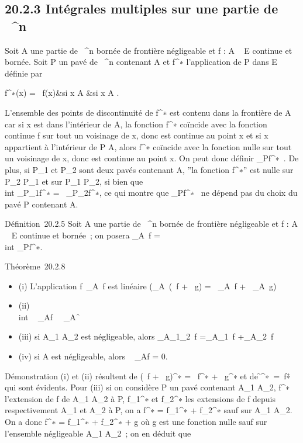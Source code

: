 \documentclass[]{article}
\begin{document}
\subsection{20.2.3 Intégrales multiples sur une partie de ~^n}

Soit A une partie de ~^n bornée de frontière négligeable et f
: A \rightarrow~ E continue et bornée. Soit P un pavé de ~^n contenant A
et f^∗ l'application de P dans E définie par

 f^∗(x) = \left \
\cases f(x)&si x \in A  &si x \in A
 \right .

L'ensemble des points de discontinuité de f^∗ est contenu
dans la frontière de A car si x est dans l'intérieur de A, la fonction
f^∗ coïncide avec la fonction continue f sur tout un
voisinage de x, donc est continue au point x et si x appartient à
l'intérieur de P \diagdown A, alors f^∗ coïncide avec la fonction
nulle sur tout un voisinage de x, donc est continue au point x. On peut
donc définir \int  _Pf^∗~. De
plus, si P_1 et P_2 sont deux pavés contenant A, ''la
fonction f^∗'' est nulle sur P_2 \diagdown P_1 et
sur P_1 \diagdown P_2, si bien que \\int
 _P_1f^∗ =\int ~
_P_2f^∗, ce qui montre que
\int  _Pf^∗~ ne dépend pas du
choix du pavé P contenant A.

Définition~20.2.5 Soit A une partie de ~^n bornée de
frontière négligeable et f : A \rightarrow~ E continue et bornée~; on posera
\int  _A~f =\\int
 _Pf^∗.

Théorème~20.2.8

\begin{itemize}
\itemsep1pt\parskip0pt
\item
  (i) L'application
  f\mapsto~\int  _A~f
  est linéaire (\int  _A~(\alpha~f + \beta~g) =
  \alpha~\int  _A~f +
  \beta~\int  _A~g)
\item
  (ii) \\int ~
  _Af\ \leq\int ~
  _A\f\
\item
  (iii) si A_1 \bigcap A_2 est négligeable, alors
  \int  _A_1\cupA_2~f
  =\int  _A_1~f
  +\int  _A_2~f
\item
  (iv) si A est négligeable, alors \int ~
  _Af = 0.
\end{itemize}

Démonstration (i) et (ii) résultent de (\alpha~f + \beta~g)^∗ =
\alpha~f^∗ + \beta~g^∗ et de
\f^∗\
=\ f\^∗ qui
sont évidents. Pour (iii) si on considère P un pavé contenant
A_1 \cup A_2, f^∗ l'extension de f de
A_1 \cup A_2 à P, f_1^∗ et
f_2^∗ les extensions de f depuis respectivement
A_1 et A_2 à P, on a f^∗ =
f_1^∗ + f_2^∗ sauf sur A_1 \bigcap
A_2. On a donc f^∗ = f_1^∗ +
f_2^∗ + g où g est une fonction nulle sauf sur
l'ensemble négligeable A_1 \bigcap A_2~; on en déduit que
\end{document}
